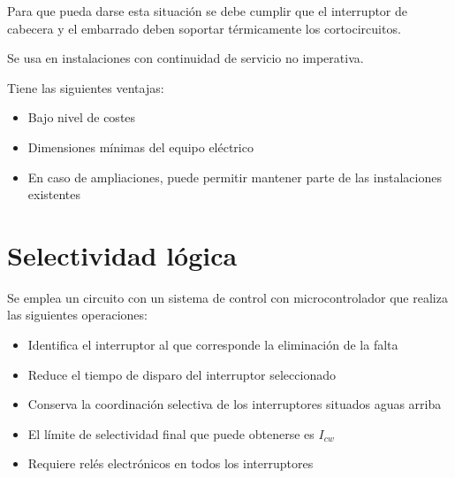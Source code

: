 Para que pueda darse esta situación se debe cumplir que el interruptor de cabecera y el embarrado deben soportar térmicamente los cortocircuitos.
\newline

Se usa en instalaciones con continuidad de servicio no imperativa.
\newline

 Tiene las siguientes ventajas:
 \begin{itemize}
 	\item Bajo nivel de costes
 
 	\item Dimensiones mínimas del equipo eléctrico
 	
 	\item En caso de ampliaciones, puede permitir mantener parte de las instalaciones existentes
 \end{itemize}
\section{Selectividad lógica}
Se emplea un circuito con un sistema de control con microcontrolador que realiza las siguientes operaciones:
\begin{itemize}
	\item Identifica el interruptor al que corresponde la eliminación de la falta
	\item Reduce el tiempo de disparo del interruptor seleccionado
	\item Conserva la coordinación selectiva de los interruptores situados aguas arriba
	\item 	El límite de selectividad final que puede obtenerse es $I_{cw}$
	\item	Requiere relés electrónicos en todos los interruptores 
\end{itemize}